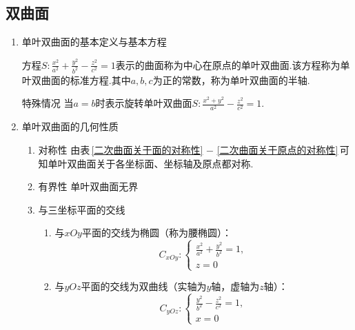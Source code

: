 \subsection{双曲面}\label{双曲面}
\sja
\begin{enumerate}
	\setlength{\itemindent}{0em}
	\setlength{\topsep}{0.01em}
	\setlength{\itemsep}{0.01em}
	\item 单叶双曲面的基本定义与基本方程
	\vspace*{0.5em}
	
\enbelowdefination[单叶双曲面]
\kg 方程$\displaystyle S:\frac{x^2}{a^2}+\frac{y^2}{b^2}-\frac{z^2}{c^2}=1$表示的曲面称为中心在原点的{\color{dy}单叶双曲面}.该方程称为{\color{dy}单叶双曲面的标准方程}.其中$a,b,c$为正的常数，称为单叶双曲面的{\color{dy}半轴}.
\par {\color{dy}特殊情况}
\kg 当$a=b$时表示{\color{dy}旋转单叶双曲面}\label{旋转单叶双曲面}$\displaystyle S:\frac{x^2+y^2}{a^2}-\frac{z^2}{c^2}=1.$

	\item 单叶双曲面的几何性质
	\sja
	\begin{enumerate}
		\setlength{\topsep}{0.01em}
		\setlength{\itemsep}{0.01em}
		
		\item 对称性 
		\kg 由表$\,$\ref{二次曲面关于面的对称性}  $-$ \ref{二次曲面关于原点的对称性}$\,$可知单叶双曲面关于各坐标面、坐标轴及原点都对称.
		
		\item 有界性 \kg  单叶双曲面无界
		
		\item 与三坐标平面的交线
		
		\begin{enumerate}
			\setlength{\topsep}{0.01em}
			\setlength{\itemsep}{0.01em}
			\item 与$xOy$平面的交线为椭圆（称为腰椭圆）：
			\begin{equation}
			C_{xOy}:
			\begin{cases}
			\displaystyle \frac{x^2}{a^2}+\frac{y^2}{b^2}=1,\\
			z=0
			\end{cases}
			\label{S1.1}
			\end{equation}
			
			\item 与$yOz$平面的交线为双曲线（实轴为$y$轴，虚轴为$z$轴）：
			\begin{equation}
			C_{yOz}:
			\begin{cases}
			\displaystyle \frac{y^2}{b^2}-\frac{z^2}{c^2}=1,\\
			x=0
			\end{cases}
			\label{S1.2}
			\end{equation}
			

\end{enumerate}
\end{enumerate}
\end{enumerate}

